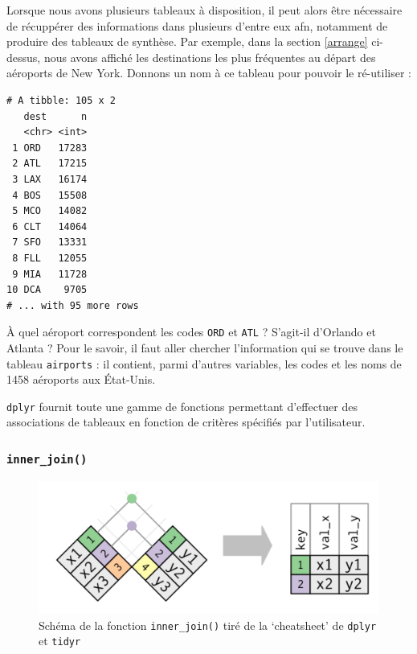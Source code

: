 \documentclass[a4paperpaper,]{article}
\newenvironment{Shaded}{\begin{snugshade}}{\end{snugshade}}
\newcommand{\KeywordTok}[1]{\textcolor[rgb]{0.13,0.29,0.53}{\textbf{#1}}}
\newcommand{\StringTok}[1]{\textcolor[rgb]{0.31,0.60,0.02}{#1}}
\newcommand{\OperatorTok}[1]{\textcolor[rgb]{0.81,0.36,0.00}{\textbf{#1}}}
\newcommand{\NormalTok}[1]{#1}
\theoremstyle{definition}
\theoremstyle{definition}
\theoremstyle{definition}
\theoremstyle{remark}
\begin{document}
Lorsque nous avons plusieurs tableaux à disposition, il peut alors être
nécessaire de récuppérer des informations dans plusieurs d'entre eux
afn, notamment de produire des tableaux de synthèse. Par exemple, dans
la section \ref{arrange} ci-dessus, nous avons affiché les destinations
les plus fréquentes au départ des aéroports de New York. Donnons un nom
à ce tableau pour pouvoir le ré-utiliser :

\begin{Shaded}
\end{Shaded}

\begin{verbatim}
# A tibble: 105 x 2
   dest      n
   <chr> <int>
 1 ORD   17283
 2 ATL   17215
 3 LAX   16174
 4 BOS   15508
 5 MCO   14082
 6 CLT   14064
 7 SFO   13331
 8 FLL   12055
 9 MIA   11728
10 DCA    9705
# ... with 95 more rows
\end{verbatim}

À quel aéroport correspondent les codes \texttt{ORD} et \texttt{ATL} ?
S'agit-il d'Orlando et Atlanta ? Pour le savoir, il faut aller chercher
l'information qui se trouve dans le tableau \texttt{airports} : il
contient, parmi d'autres variables, les codes et les noms de 1458
aéroports aux État-Unis.

\texttt{dplyr} fournit toute une gamme de fonctions permettant
d'effectuer des associations de tableaux en fonction de critères
spécifiés par l'utilisateur.

\subsubsection{\texorpdfstring{\texttt{inner\_join()}}{inner\_join()}}\label{inner_join}

\begin{figure}[htpb]

{\centering \includegraphics[width=0.5\linewidth]{images/innerjoin} 

}

\caption{Schéma de la fonction \texttt{inner\_join()} tiré de la
`cheatsheet' de \texttt{dplyr} et \texttt{tidyr}}\label{fig:inner}
\end{figure}
\end{document}
